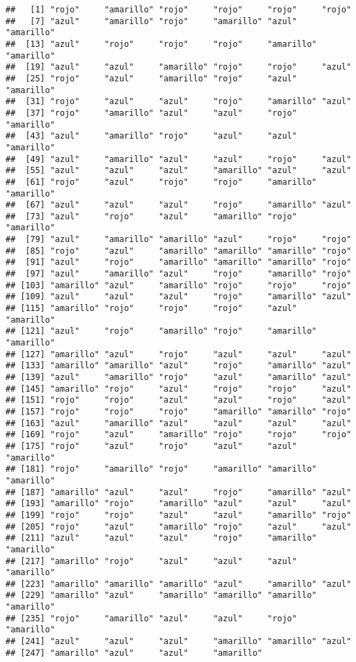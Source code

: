 \documentclass[
]{article}
\begin{document}
\begin{verbatim}
##   [1] "rojo"     "amarillo" "rojo"     "rojo"     "rojo"     "rojo"    
##   [7] "azul"     "amarillo" "rojo"     "amarillo" "azul"     "amarillo"
##  [13] "azul"     "rojo"     "rojo"     "rojo"     "amarillo" "amarillo"
##  [19] "azul"     "azul"     "amarillo" "rojo"     "rojo"     "azul"    
##  [25] "rojo"     "azul"     "amarillo" "rojo"     "azul"     "amarillo"
##  [31] "rojo"     "azul"     "azul"     "rojo"     "amarillo" "azul"    
##  [37] "rojo"     "amarillo" "azul"     "azul"     "rojo"     "amarillo"
##  [43] "azul"     "amarillo" "rojo"     "azul"     "azul"     "amarillo"
##  [49] "azul"     "amarillo" "azul"     "azul"     "rojo"     "azul"    
##  [55] "azul"     "azul"     "azul"     "amarillo" "azul"     "azul"    
##  [61] "rojo"     "azul"     "rojo"     "rojo"     "amarillo" "amarillo"
##  [67] "azul"     "azul"     "azul"     "rojo"     "amarillo" "azul"    
##  [73] "azul"     "rojo"     "azul"     "amarillo" "rojo"     "amarillo"
##  [79] "azul"     "amarillo" "amarillo" "azul"     "rojo"     "rojo"    
##  [85] "rojo"     "azul"     "amarillo" "amarillo" "amarillo" "rojo"    
##  [91] "azul"     "rojo"     "amarillo" "amarillo" "amarillo" "rojo"    
##  [97] "azul"     "amarillo" "azul"     "rojo"     "amarillo" "rojo"    
## [103] "amarillo" "azul"     "amarillo" "rojo"     "rojo"     "rojo"    
## [109] "azul"     "azul"     "azul"     "rojo"     "amarillo" "azul"    
## [115] "amarillo" "rojo"     "rojo"     "rojo"     "azul"     "amarillo"
## [121] "azul"     "rojo"     "amarillo" "rojo"     "amarillo" "amarillo"
## [127] "amarillo" "azul"     "rojo"     "azul"     "azul"     "azul"    
## [133] "amarillo" "amarillo" "azul"     "rojo"     "amarillo" "azul"    
## [139] "azul"     "amarillo" "rojo"     "azul"     "amarillo" "azul"    
## [145] "amarillo" "rojo"     "azul"     "rojo"     "rojo"     "azul"    
## [151] "rojo"     "rojo"     "azul"     "azul"     "rojo"     "azul"    
## [157] "rojo"     "rojo"     "rojo"     "amarillo" "amarillo" "rojo"    
## [163] "azul"     "amarillo" "azul"     "azul"     "azul"     "azul"    
## [169] "rojo"     "azul"     "amarillo" "rojo"     "rojo"     "rojo"    
## [175] "rojo"     "azul"     "rojo"     "azul"     "azul"     "amarillo"
## [181] "rojo"     "amarillo" "rojo"     "amarillo" "amarillo" "amarillo"
## [187] "amarillo" "azul"     "azul"     "rojo"     "amarillo" "azul"    
## [193] "amarillo" "rojo"     "amarillo" "azul"     "azul"     "azul"    
## [199] "rojo"     "rojo"     "azul"     "azul"     "amarillo" "rojo"    
## [205] "rojo"     "azul"     "amarillo" "rojo"     "azul"     "azul"    
## [211] "azul"     "azul"     "azul"     "rojo"     "amarillo" "amarillo"
## [217] "amarillo" "rojo"     "azul"     "azul"     "azul"     "amarillo"
## [223] "amarillo" "amarillo" "amarillo" "azul"     "amarillo" "azul"    
## [229] "amarillo" "azul"     "amarillo" "amarillo" "amarillo" "amarillo"
## [235] "rojo"     "amarillo" "azul"     "azul"     "rojo"     "amarillo"
## [241] "azul"     "azul"     "azul"     "amarillo" "amarillo" "azul"    
## [247] "amarillo" "azul"     "azul"     "amarillo"
\end{verbatim}
\end{document}
